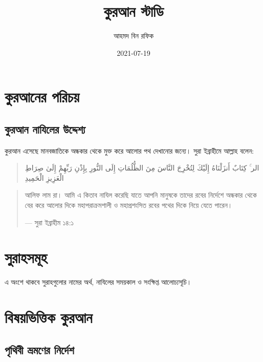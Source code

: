 \documentclass[
]{book}
\title{কুরআন স্টাডি}
\author{আহমদ বিন রফিক}
\date{2021-07-19}
\begin{document}
\maketitle

{
\setcounter{tocdepth}{1}
\tableofcontents
}
\hypertarget{about-quran}{%
\chapter*{কুরআনের পরিচয়}\label{about-quran}}

\hypertarget{why-quran-was-revealed}{%
\section*{কুরআন নাযিলের উদ্দেশ্য}\label{why-quran-was-revealed}}

কুরআন এসেছে মানবজাতিকে অন্ধকার থেকে মুক্ত করে আলোর পথ দেখানোর জন্যে। সুরা ইব্রাহীমে আল্লাহ বলেন:

\begin{quote}
الر ۚ كِتَابٌ أَنزَلْنَاهُ إِلَيْكَ لِتُخْرِجَ النَّاسَ مِنَ الظُّلُمَاتِ إِلَى النُّورِ بِإِذْنِ رَبِّهِمْ إِلَىٰ صِرَاطِ الْعَزِيزِ الْحَمِيدِ
\end{quote}

\begin{quote}
আলিফ লাম রা। আমি এ কিতাব নাযিল করেছি যাতে আপনি মানুষকে তাদের রবের নির্দেশে অন্ধকার থেকে বের করে আলোর দিকে মহাপরাক্রমশালী ও মহাপ্রশংসিত রবের পথের দিকে নিয়ে যেতে পারেন।

--- সুরা ইব্রাহীম ১৪:১
\end{quote}

\hypertarget{surah}{%
\chapter*{সুরাহসমূহ}\label{surah}}

এ অংশে থাকবে সুরাহগুলোর নামের অর্থ, নাযিলের সময়কাল ও সংক্ষিপ্ত আলোচ্যসূচি।

\hypertarget{quran-index}{%
\chapter*{বিষয়ভিত্তিক কুরআন}\label{quran-index}}

\hypertarget{traveling}{%
\section*{পৃথিবী ভ্রমণের নির্দেশ}\label{traveling}}
\end{document}
